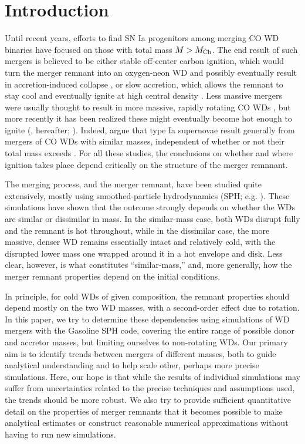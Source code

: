 \section{Introduction}
\label{sec:c2_intro}

Until recent years, efforts to find SN Ia progenitors among merging CO WD binaries have focused on those with total mass $M>\Mch$.  The end result of such mergers is believed to be either stable off-center carbon ignition, which would turn the merger remnant into an oxygen-neon WD and possibly eventually result in accretion-induced collapse \citep{saion98}, or slow accretion, which allows the remnant to stay cool and eventually ignite at high central density \citep{yoonpr07}.  Less massive mergers were usually thought to result in more massive, rapidly rotating CO WDs \citep{segrcm97,kube+10}, but more recently it has been realized these might eventually become hot enough to ignite (\citealt{vkercj10}, \citeal{vkercj10} hereafter; \citealt{shen+12,schw+12}).  Indeed, \citeal{vkercj10} argue that type Ia supernovae result generally from mergers of CO WDs with similar masses, independent of whether or not their total mass exceeds \Mch.  For all these studies, the conclusions on whether and where ignition takes place depend critically on the structure of the merger remnnant.

The merging process, and the merger remnant, have been studied quite extensively, mostly using smoothed-particle hydrodynamics (SPH; e.g. \citealt{mona05}).  These simulations have shown that the outcome strongly depends on whether the WDs are similar or dissimilar in mass.  In the similar-mass case, both WDs disrupt fully and the remnant is hot throughout, while in the dissimilar case, the more massive, denser WD remains essentially intact and relatively cold, with the disrupted lower mass one wrapped around it in a hot envelope and disk.  Less clear, however, is what constitutes ``similar-mass,'' and, more generally, how the merger remnant properties depend on the initial conditions.  

In principle, for cold WDs of given composition, the remnant properties should depend mostly on the two WD masses, with a second-order effect due to rotation.  In this paper, we try to determine these dependencies using simulations of WD mergers with the Gasoline SPH code, covering the entire range of possible donor and accretor masses, but limiting ourselves to non-rotating WDs.  Our primary aim is to identify trends between mergers of different masses, both to guide analytical understanding and to help scale other, perhaps more precise simulations.  Here, our hope is that while the results of individual simulations may suffer from uncertainties related to the precise techniques and assumptions used, the trends should be more robust.  We also try to provide sufficient quantitative detail on the properties of merger remnants that it becomes possible to make analytical estimates or construct reasonable numerical approximations without having to run new simulations.


